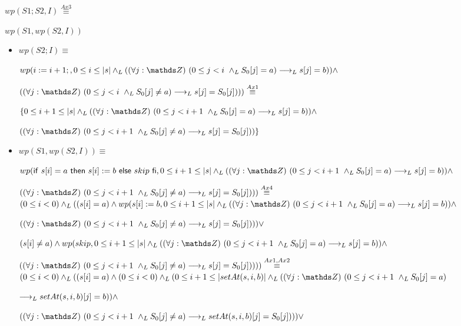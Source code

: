 \documentclass{article}
\begin{document}
$wp(S1;S2, I) \stackrel{Ax3}{\equiv}$

$wp(S1, wp(S2, I))$

\begin{itemize}
    \item $wp(S2; I) \equiv$

    $wp(i:= i+1;, 0 \leq i \leq \longitud{s} \yLuego (\paraTodo{j}{(0}{i} \yLuego S_{0}[j] = a) \implicaLuego s[j] = b)) \wedge $

    $ (\paraTodo{j}{(0}{i} \yLuego S_{0}[j] \neq a) \implicaLuego s[j] = S_{0}[j]))) \stackrel{Ax1}{\equiv}$

    $\{0 \leq i+1 \leq \longitud{s} \yLuego (\paraTodo{j}{(0}{i+1} \yLuego S_{0}[j] = a) \implicaLuego s[j] = b)) \wedge $

    $ (\paraTodo{j}{(0}{i+1} \yLuego S_{0}[j] \neq a) \implicaLuego s[j] = S_{0}[j]))\}$

    \item $wp(S1, wp(S2, I)) \equiv$

    $wp(\IfThenElse{s[i]=a}{s[i]:=b}{skip}, 0 \leq i+1 \leq \longitud{s} \yLuego (\paraTodo{j}{(0}{i+1} \yLuego S_{0}[j] = a) \implicaLuego s[j] = b)) \wedge $

    $ (\paraTodo{j}{(0}{i+1} \yLuego S_{0}[j] \neq a) \implicaLuego s[j] = S_{0}[j])))\stackrel{Ax4}{\equiv}$\\

    $ (0 \leq i < 0) \yLuego ( (s[i] = a) \wedge wp(s[i]:=b, 0 \leq i+1 \leq \longitud{s} \yLuego (\paraTodo{j}{(0}{i+1} \yLuego S_{0}[j] = a) \implicaLuego s[j] = b)) \wedge $

    $ (\paraTodo{j}{(0}{i+1} \yLuego S_{0}[j] \neq a) \implicaLuego s[j] = S_{0}[j]))) \vee $
    
    $ (s[i] \neq a) \wedge wp(skip, 0 \leq i+1 \leq \longitud{s} \yLuego (\paraTodo{j}{(0}{i+1} \yLuego S_{0}[j] = a) \implicaLuego s[j] = b)) \wedge $

    $ (\paraTodo{j}{(0}{i+1} \yLuego S_{0}[j] \neq a) \implicaLuego s[j] = S_{0}[j]))) ) \stackrel{Ax1,Ax2}{\equiv}$ \\

    $ (0 \leq i < 0) \yLuego ( (s[i] = a) \wedge (0 \leq i < 0) \yLuego (0 \leq i+1 \leq \longitud{setAt(s,i,b)} \yLuego (\paraTodo{j}{(0}{i+1} \yLuego S_{0}[j] = a) $

    $ \longrightarrow _L setAt(s,i,b)[j] = b)) \wedge $

    $ (\paraTodo{j}{(0}{i+1} \yLuego S_{0}[j] \neq a) \implicaLuego setAt(s,i,b)[j] = S_{0}[j]))) \vee $
    

\end{itemize}
\end{document}
